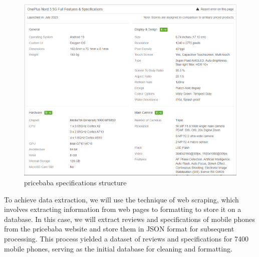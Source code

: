 \begin{figure}[H]
    \centering
    \includegraphics[width=12cm]{images/pricebaba_spec_structure.png}
    \caption{pricebaba specifications structure \cite{OnePlusNord35G2023}}
    \label{fig:pricebaba-spec-structure}
\end{figure}
To achieve data extraction, we will use the technique of web scraping, which involves extracting information from web pages to formatting to store it on a database. In this case, we will extract reviews and specifications of mobile phones from the pricebaba website and store them in JSON format for subsequent processing. This process yielded a dataset of reviews and specifications for 7400 mobile phones, serving as the initial database for cleaning and formatting.

